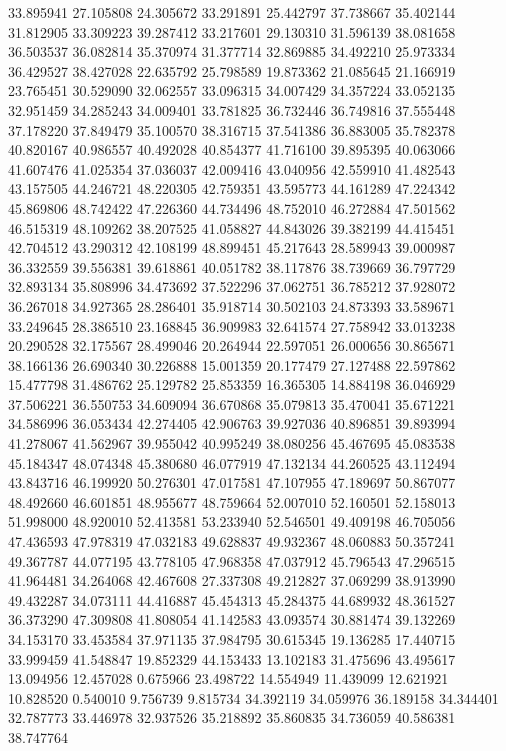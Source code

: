 33.895941
27.105808
24.305672
33.291891
25.442797
37.738667
35.402144
31.812905
33.309223
39.287412
33.217601
29.130310
31.596139
38.081658
36.503537
36.082814
35.370974
31.377714
32.869885
34.492210
25.973334
36.429527
38.427028
22.635792
25.798589
19.873362
21.085645
21.166919
23.765451
30.529090
32.062557
33.096315
34.007429
34.357224
33.052135
32.951459
34.285243
34.009401
33.781825
36.732446
36.749816
37.555448
37.178220
37.849479
35.100570
38.316715
37.541386
36.883005
35.782378
40.820167
40.986557
40.492028
40.854377
41.716100
39.895395
40.063066
41.607476
41.025354
37.036037
42.009416
43.040956
42.559910
41.482543
43.157505
44.246721
48.220305
42.759351
43.595773
44.161289
47.224342
45.869806
48.742422
47.226360
44.734496
48.752010
46.272884
47.501562
46.515319
48.109262
38.207525
41.058827
44.843026
39.382199
44.415451
42.704512
43.290312
42.108199
48.899451
45.217643
28.589943
39.000987
36.332559
39.556381
39.618861
40.051782
38.117876
38.739669
36.797729
32.893134
35.808996
34.473692
37.522296
37.062751
36.785212
37.928072
36.267018
34.927365
28.286401
35.918714
30.502103
24.873393
33.589671
33.249645
28.386510
23.168845
36.909983
32.641574
27.758942
33.013238
20.290528
32.175567
28.499046
20.264944
22.597051
26.000656
30.865671
38.166136
26.690340
30.226888
15.001359
20.177479
27.127488
22.597862
15.477798
31.486762
25.129782
25.853359
16.365305
14.884198
36.046929
37.506221
36.550753
34.609094
36.670868
35.079813
35.470041
35.671221
34.586996
36.053434
42.274405
42.906763
39.927036
40.896851
39.893994
41.278067
41.562967
39.955042
40.995249
38.080256
45.467695
45.083538
45.184347
48.074348
45.380680
46.077919
47.132134
44.260525
43.112494
43.843716
46.199920
50.276301
47.017581
47.107955
47.189697
50.867077
48.492660
46.601851
48.955677
48.759664
52.007010
52.160501
52.158013
51.998000
48.920010
52.413581
53.233940
52.546501
49.409198
46.705056
47.436593
47.978319
47.032183
49.628837
49.932367
48.060883
50.357241
49.367787
44.077195
43.778105
47.968358
47.037912
45.796543
47.296515
41.964481
34.264068
42.467608
27.337308
49.212827
37.069299
38.913990
49.432287
34.073111
44.416887
45.454313
45.284375
44.689932
48.361527
36.373290
47.309808
41.808054
41.142583
43.093574
30.881474
39.132269
34.153170
33.453584
37.971135
37.984795
30.615345
19.136285
17.440715
33.999459
41.548847
19.852329
44.153433
13.102183
31.475696
43.495617
13.094956
12.457028
0.675966
23.498722
14.554949
11.439099
12.621921
10.828520
0.540010
9.756739
9.815734
34.392119
34.059976
36.189158
34.344401
32.787773
33.446978
32.937526
35.218892
35.860835
34.736059
40.586381
38.747764
